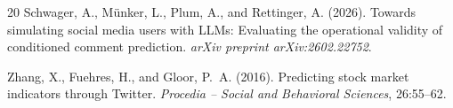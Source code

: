 \documentclass[11pt,a4paper]{article}
\begin{document}
\begin{thebibliography}{20}
Schwager, A., M\"{u}nker, L., Plum, A., and Rettinger, A. (2026).
\newblock Towards simulating social media users with LLMs: Evaluating the operational validity of conditioned comment prediction.
\newblock \textit{arXiv preprint arXiv:2602.22752}.

Zhang, X., Fuehres, H., and Gloor, P.~A. (2016).
\newblock Predicting stock market indicators through Twitter.
\newblock \textit{Procedia -- Social and Behavioral Sciences}, 26:55--62.

\end{thebibliography}
\end{document}
